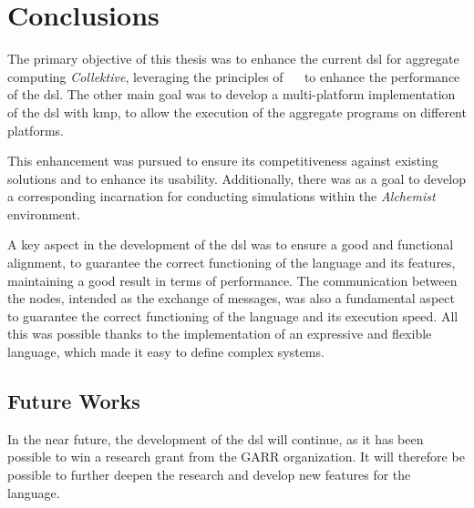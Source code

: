 
\chapter{Conclusions}
\label{ch:conclusions}

The primary objective of this thesis was to enhance the current \ac{dsl} for aggregate computing \emph{Collektive},
leveraging the principles of ~\xc~ to enhance the performance of the \ac{dsl}.
The other main goal was to develop a multi-platform implementation of the \ac{dsl} with \ac{kmp}, to allow the execution
of the aggregate programs on different platforms.

This enhancement was pursued to ensure its competitiveness against existing solutions and to enhance its usability.
Additionally, there was as a goal to develop a corresponding incarnation for conducting simulations within the \emph{Alchemist} environment.

A key aspect in the development of the \ac{dsl} was to ensure a good and functional alignment, to guarantee
the correct functioning of the language and its features, maintaining a good result in terms of performance.
The communication between the nodes, intended as the exchange of messages, was also a fundamental aspect to guarantee
the correct functioning of the language and its execution speed.
All this was possible thanks to the implementation of an expressive and flexible language, which made it easy to define complex systems.

\section{Future Works}
\label{sec:future-works}
In the near future, the development of the \ac{dsl} will continue, as it has been possible to win a research grant from the GARR organization.
It will therefore be possible to further deepen the research and develop new features for the language.

